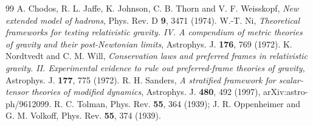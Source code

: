 \documentclass[11pt,a4paper]{article}
\begin{document}
\begin{thebibliography}{99}
 A. Chodos, R. L. Jaffe, K. Johnson, C. B. Thorn and V. F. Weisskopf, \textit{New extended model of hadrons}, Phys. Rev. D \textbf{9}, 3471 (1974).
 W.-T. Ni, \textit{Theoretical frameworks for testing relativistic gravity. IV. A compendium of metric theories of gravity and their post-Newtonian limits}, Astrophys. J. \textbf{176}, 769 (1972).
 K. Nordtvedt and C. M. Will, \textit{Conservation laws and preferred frames in relativistic gravity. II. Experimental evidence to rule out preferred-frame theories of gravity}, Astrophys. J. \textbf{177}, 775 (1972).
 R. H. Sanders, \textit{A stratified framework for scalar-tensor theories of modified dynamics}, Astrophys. J. \textbf{480}, 492 (1997), arXiv:astro-ph/9612099.
 R. C. Tolman, Phys. Rev. \textbf{55}, 364 (1939); J. R. Oppenheimer and G. M. Volkoff, Phys. Rev. \textbf{55}, 374 (1939).
\end{thebibliography}
\end{document}
